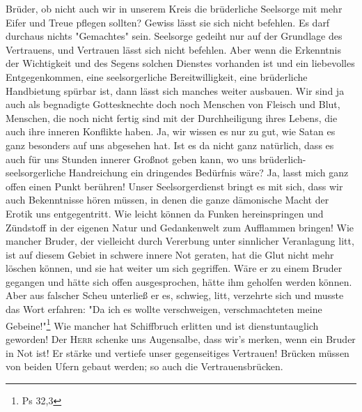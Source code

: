 \documentclass[a5paper,openany]{book}
\begin{document}
Brüder, ob nicht auch wir in unserem Kreis die brüderliche Seelsorge mit mehr Eifer und Treue pflegen sollten? Gewiss lässt sie sich nicht befehlen. Es darf durchaus nichts "Gemachtes" sein. Seelsorge gedeiht nur auf der Grundlage des Vertrauens, und Vertrauen lässt sich nicht befehlen. Aber wenn die Erkenntnis der Wichtigkeit und des Segens solchen Dienstes vorhanden ist und ein liebevolles Entgegenkommen, eine seelsorgerliche Bereitwilligkeit, eine brüderliche Handbietung spürbar ist, dann lässt sich manches weiter ausbauen. Wir sind ja auch als begnadigte Gottesknechte doch noch Menschen von Fleisch und Blut, Menschen, die noch nicht fertig sind mit der Durchheiligung ihres Lebens, die auch ihre inneren Konflikte haben. Ja, wir wissen es nur zu gut, wie Satan es ganz besonders auf uns abgesehen hat. Ist es da nicht ganz natürlich, dass es auch für uns Stunden innerer Großnot geben kann, wo uns brüderlich-seelsorgerliche Handreichung ein dringendes Bedürfnis wäre? Ja, lasst mich ganz offen einen Punkt berühren! Unser Seelsorgerdienst bringt es mit sich, dass wir auch Bekenntnisse hören müssen, in denen die ganze dämonische Macht der Erotik uns entgegentritt. Wie leicht können da Funken hereinspringen und Zündstoff in der eigenen Natur und Gedankenwelt zum Aufflammen bringen! Wie mancher Bruder, der vielleicht durch Vererbung unter sinnlicher Veranlagung litt, ist auf diesem Gebiet in schwere innere Not geraten, hat die Glut nicht mehr löschen können, und sie hat weiter um sich gegriffen. Wäre er zu einem Bruder gegangen und hätte sich offen ausgesprochen, hätte ihm geholfen werden können. Aber aus falscher Scheu unterließ er es, schwieg, litt, verzehrte sich und musste das Wort erfahren: "Da ich es wollte verschweigen, verschmachteten meine Gebeine!"\footnote{Ps 32,3} Wie mancher hat Schiffbruch erlitten und ist dienstuntauglich geworden! Der \textsc{Herr} schenke uns Augensalbe, dass wir's merken, wenn ein Bruder in Not ist! Er stärke und vertiefe unser gegenseitiges Vertrauen! Brücken müssen von beiden Ufern gebaut werden; so auch die Vertrauensbrücken.
\par
\end{document}
